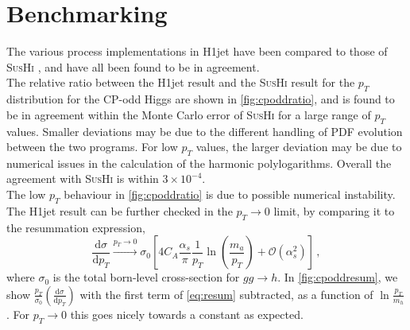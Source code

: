 \documentclass[12pt,a4wide]{article}
\begin{document}
\newpage 

\section{Benchmarking} \label{sec:benchmarking} 
The various process implementations in H1jet have been compared to those of \textsc{SusHi} \cite{bib:sushi}, and have all been found to be in agreement. \\ 

The relative ratio between the H1jet result and the \textsc{SusHi} result for the $p_T$ distribution for the CP-odd Higgs are shown in \autoref{fig:cpoddratio}, and is found to be in agreement within the Monte Carlo error of \textsc{SusHi} for a large range of $p_T$ values. Smaller deviations may be due to the different handling of PDF evolution between the two programs. For low $p_T$ values, the larger deviation may be due to numerical issues in the calculation of the harmonic polylogarithms. Overall the agreement with \textsc{SusHi} is within $3 \times 10^{-4}$. \\ 

The low $p_T$ behaviour in \autoref{fig:cpoddratio} is due to possible numerical instability. The H1jet result can be further checked in the $p_{T} \rightarrow 0$ limit, by comparing it to the resummation expression, 
\begin{equation}
	\frac{\mathrm{d} \sigma}{\mathrm{d} p_T} \xrightarrow{p_T \rightarrow 0} \sigma_0 \left [ 4 C_A \frac{\alpha_s}{\pi} \frac{1}{p_T} \ln\left ( \frac{m_a}{p_T} \right ) + \mathcal{O} ( \alpha_s^2 ) \right ] \,, \label{eq:resum}
\end{equation}
where $\sigma_0$ is the total born-level cross-section for $gg \rightarrow h$. In \autoref{fig:cpoddresum}, we show $\frac{p_T}{\sigma_0} \left ( \frac{\mathrm{d} \sigma}{\mathrm{d} p_T} \right )$ with the first term of \autoref{eq:resum} subtracted, as a function of $\ln \frac{p_T}{m_h}$. For $p_T \rightarrow 0$ this goes nicely towards a constant as expected. 

\newpage 
\end{document}
